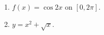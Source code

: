 \documentclass[11pt]{article}
\begin{document}
\newpage

\begin{multicols}{2}
\begin{enumerate}
\setcounter{enumi}{\theenumCount}
\item $f(x) = \cos 2x$ on $[0,2\pi]$.
\item $y = x^2 + \sqrt{x}$.
\setcounter{enumCount}{\theenumi}
\end{enumerate}
\end{multicols}
\vfill
%
%
\end{document}
